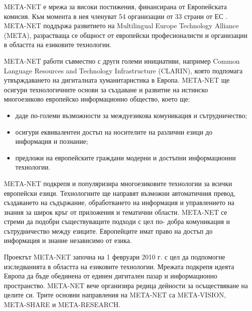 \documentclass[]{../../metanetpaper}
\begin{document}
\begin{multicols}{2}

  META-NET е мрежа за високи постижения, финансирана от Европейската
  комисия. Към момента в нея членуват 54 организации от 33 страни от
  ЕС \cite{rehm2011}. META-NET поддържа развитието
  на Multilingual Europe Technology Alliance
  (META), разрастваща се общност от
  европейски професионалисти и организации в областта на езиковите
  технологии.

META-NET работи съвместно с други големи инициативи, например Common Language Resources and Technology Infrastructure (CLARIN), която подпомага утвърждаването на дигиталната хуманитаристика в Европа. META-NET ще осигури  технологичните основи за създаване и развитие на истинско многоезиково европейско информационно общество, което ще:

\begin{itemize}
\item даде по-големи възможности за междуезикова комуникация и сътрудничество;
\item осигури еквивалентен достъп на носителите на различни езици до информация и познание;
\item предложи на европейските граждани модерни и достъпни информационни
 технологии.
\end{itemize}

META-NET подкрепя и популяризира многоезиковите технологии за всички
европейски езици. Технологиите ще направят възможни автоматичния
превод, създаването на съдържание, обработването на информация и
управлението на знания за широк кръг от приложения и тематични
области. META-NET се стреми да подобри съществуващите подходи с цел
по- добра комуникация и сътрудничество между езиците.  Европейците
имат право на достъп до информация и знание независимо от езика.

Проектът META-NET започна на 1 февруари 2010 г. с цел да подпомогне
изследванията в областта на езиковите технологии. Мрежата подкрепя
идеята Европа да бъде обединена от единен дигитален пазар и
информационно пространство. META-NET вече организира редица дейности
за осъществяване на целите си. Трите основни направления на META-NET
са META-VISION, META-SHARE и META-RESEARCH.


\end{multicols}
\end{document}
